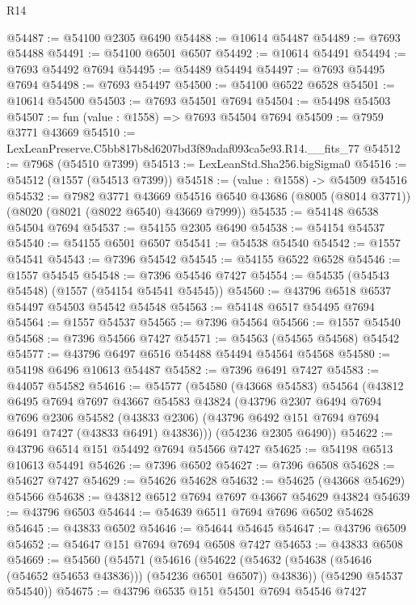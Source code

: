 \begin{lexlean}{R14}
\begin{coremodule}
@54487 := @54100 @2305 @6490
@54488 := @10614 @54487
@54489 := @7693 @54488
@54491 := @54100 @6501 @6507
@54492 := @10614 @54491
@54494 := @7693 @54492 @7694
@54495 := @54489 @54494
@54497 := @7693 @54495 @7694
@54498 := @7693 @54497
@54500 := @54100 @6522 @6528
@54501 := @10614 @54500
@54503 := @7693 @54501 @7694
@54504 := @54498 @54503
@54507 := fun (value : @1558) => @7693 @54504 @7694
@54509 := @7959 @3771 @43669
@54510 := LexLeanPreserve.C5bb817b8d6207bd3f89adaf093ca5e93.R14.__fits_77
@54512 := @7968 (@54510 @7399)
@54513 := LexLeanStd.Sha256.bigSigma0
@54516 := @54512 (@1557 (@54513 @7399))
@54518 := (value : @1558) -> @54509 @54516
@54532 := @7982
    @3771
    @43669
    @54516
    @6540
    @43686
    (@8005 (@8014 @3771))
    (@8020 (@8021 (@8022 @6540) @43669 @7999))
@54535 := @54148 @6538 @54504 @7694
@54537 := @54155 @2305 @6490
@54538 := @54154 @54537
@54540 := @54155 @6501 @6507
@54541 := @54538 @54540
@54542 := @1557 @54541
@54543 := @7396 @54542
@54545 := @54155 @6522 @6528
@54546 := @1557 @54545
@54548 := @7396 @54546 @7427
@54554 := @54535 (@54543 @54548) (@1557 (@54154 @54541 @54545))
@54560 := @43796 @6518 @6537 @54497 @54503 @54542 @54548
@54563 := @54148 @6517 @54495 @7694
@54564 := @1557 @54537
@54565 := @7396 @54564
@54566 := @1557 @54540
@54568 := @7396 @54566 @7427
@54571 := @54563 (@54565 @54568) @54542
@54577 := @43796 @6497 @6516 @54488 @54494 @54564 @54568
@54580 := @54198 @6496 @10613 @54487
@54582 := @7396 @6491 @7427
@54583 := @44057 @54582
@54616 := @54577
    (@54580
      (@43668 @54583)
      @54564
      (@43812
        @6495
        @7694
        @7697
        @43667
        @54583
        @43824
        (@43796
          @2307
          @6494
          @7694
          @7696
          @2306
          @54582
          (@43833 @2306)
          (@43796 @6492 @151 @7694 @7694 @6491 @7427 (@43833 @6491) @43836)))
      (@54236 @2305 @6490))
@54622 := @43796 @6514 @151 @54492 @7694 @54566 @7427
@54625 := @54198 @6513 @10613 @54491
@54626 := @7396 @6502
@54627 := @7396 @6508
@54628 := @54627 @7427
@54629 := @54626 @54628
@54632 := @54625 (@43668 @54629) @54566
@54638 := @43812 @6512 @7694 @7697 @43667 @54629 @43824
@54639 := @43796 @6503
@54644 := @54639 @6511 @7694 @7696 @6502 @54628
@54645 := @43833 @6502
@54646 := @54644 @54645
@54647 := @43796 @6509
@54652 := @54647 @151 @7694 @7694 @6508 @7427
@54653 := @43833 @6508
@54669 := @54560
    (@54571
      (@54616
        (@54622 (@54632 (@54638 (@54646 (@54652 @54653 @43836))) (@54236 @6501 @6507)) @43836))
      (@54290 @54537 @54540))
@54675 := @43796 @6535 @151 @54501 @7694 @54546 @7427

\end{coremodule}
\end{lexlean}
